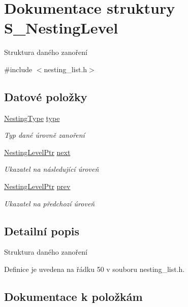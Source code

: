 \hypertarget{struct_s___nesting_level}{}\section{Dokumentace struktury S\+\_\+\+Nesting\+Level}
\label{struct_s___nesting_level}


Struktura daného zanoření  




{\ttfamily \#include $<$nesting\+\_\+list.\+h$>$}

\subsection*{Datové položky}
\begin{DoxyCompactItemize}
\item 
\hyperlink{nesting__list_8h_ae3be7fd101359a3813b67cf856c7c2d8}{Nesting\+Type} \hyperlink{struct_s___nesting_level_a112376f51f31d62569b34388e7303384}{type}
\begin{DoxyCompactList}\small\item\em Typ dané úrovně zanoření \end{DoxyCompactList}\item 
\hyperlink{nesting__list_8h_aea99292989d40bb6f97ba07eb2c820a6}{Nesting\+Level\+Ptr} \hyperlink{struct_s___nesting_level_a957430068c15e4884a37ac6c7e29eea3}{next}
\begin{DoxyCompactList}\small\item\em Ukazatel na následující úroveň \end{DoxyCompactList}\item 
\hyperlink{nesting__list_8h_aea99292989d40bb6f97ba07eb2c820a6}{Nesting\+Level\+Ptr} \hyperlink{struct_s___nesting_level_af0df77c87e9f5aff1047f2cd48964884}{prev}
\begin{DoxyCompactList}\small\item\em Ukazatel na předchozí úroveň \end{DoxyCompactList}\end{DoxyCompactItemize}


\subsection{Detailní popis}
Struktura daného zanoření 

Definice je uvedena na řádku 50 v souboru nesting\+\_\+list.\+h.



\subsection{Dokumentace k položkám}
\mbox{\label{struct_s___nesting_level_a957430068c15e4884a37ac6c7e29eea3}} 
